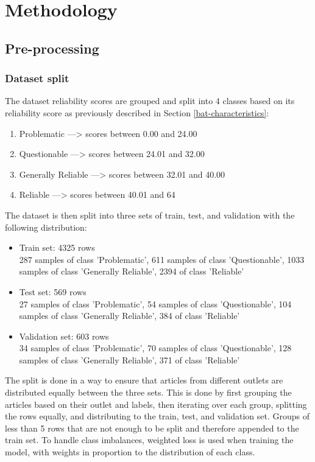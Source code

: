 \chapter{Methodology}
\label{cha:5}

\section{Pre-processing}

\subsection{Dataset split}

The dataset reliability scores are grouped and split into 4 classes based on its reliability score as previously described in Section \ref{bat-characteristics}:
\begin{enumerate}
    \item Problematic ---> scores between 0.00 and 24.00
    \item Questionable ---> scores between 24.01 and 32.00
    \item Generally Reliable ---> scores between 32.01 and 40.00
    \item Reliable ---> scores between 40.01 and 64
\end{enumerate}

The dataset is then split into three sets of train, test, and validation with the following distribution:
\begin{itemize}
    \item Train set: 4325 rows \\
          287 samples of class 'Problematic', 611 samples of class 'Questionable', 1033 samples of class 'Generally Reliable', 2394 of class 'Reliable'
    \item Test set: 569 rows \\
          27 samples of class 'Problematic', 54 samples of class 'Questionable', 104 samples of class 'Generally Reliable', 384 of class 'Reliable'
    \item Validation set: 603 rows \\
          34 samples of class 'Problematic', 70 samples of class 'Questionable', 128 samples of class 'Generally Reliable', 371 of class 'Reliable'
\end{itemize}

The split is done in a way to ensure that articles from different outlets are distributed equally between the three sets. This is done by first grouping the articles based on their outlet and labels, then iterating over each group, splitting the rows equally, and distributing to the train, test, and validation set. Groups of less than 5 rows that are not enough to be split and therefore appended to the train set. To handle class imbalances, weighted loss is used when training the model, with weights in proportion to the distribution of each class.

